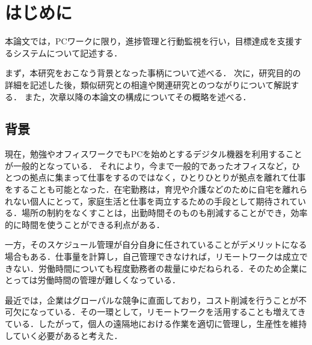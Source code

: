 \chapter{はじめに}
本論文では，PCワークに限り，進捗管理と行動監視を行い，目標達成を支援するシステムについて記述する．

まず，本研究をおこなう背景となった事柄について述べる．
次に，研究目的の詳細を記述した後，類似研究との相違や関連研究とのつながりについて解説する．
また，次章以降の本論文の構成についてその概略を述べる．

\section{背景}
現在，勉強やオフィスワークでもPCを始めとするデジタル機器を利用することが一般的となっている．
それにより，今まで一般的であったオフィスなど，ひとつの拠点に集まって仕事をするのではなく，ひとりひとりが拠点を離れて仕事をすることも可能となった．在宅勤務は，育児や介護などのために自宅を離れられない個人にとって，家庭生活と仕事を両立するための手段として期待されている．場所の制約をなくすことは，出勤時間そのものも削減することができ，効率的に時間を使うことができる利点がある．

一方，そのスケジュール管理が自分自身に任されていることがデメリットになる場合もある．仕事量を計算し，自己管理できなければ，リモートワークは成立できない．労働時間についても程度勤務者の裁量にゆだねられる．そのため企業にとっては労働時間の管理が難しくなっている．

最近では，企業はグローパルな競争に直面しており，コスト削減を行うことが不可欠になっている．その一環として，リモートワークを活用することも増えてきている．したがって，個人の遠隔地における作業を適切に管理し，生産性を維持していく必要があると考えた．


